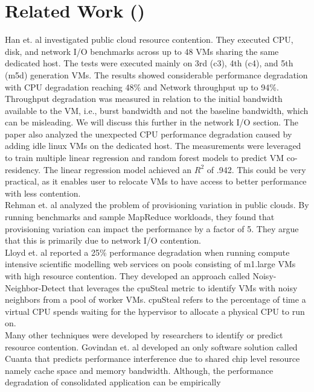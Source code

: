 \chapter{Related Work (\checkmark)}\label{chapter:related}

Han et. al \cite{characterizing_public} investigated public cloud resource contention. They executed
CPU, disk, and network I/O benchmarks across up to 48 VMs sharing the same dedicated host. The tests were
executed mainly on 3rd (c3), 4th (c4), and 5th (m5d) generation VMs.  
The results showed considerable performance degradation with CPU degradation reaching 48\% and 
Network throughput up to 94\%. Throughput degradation was measured in relation to the initial 
bandwidth available to the VM, i.e., burst bandwidth and not the baseline bandwidth, which can be misleading. 
We will discuss this further in the network I/O section. The paper also analyzed the 
unexpected CPU performance degradation caused by adding idle linux VMs on the dedicated host. 
The measurements were leveraged to train multiple linear regression and random forest models to predict
VM co-residency. The linear regression model achieved an $R^2$ of .942.
This could be very practical, as it enables user to relocate VMs to have 
access to better performance with less contention. \\
Rehman et. al \cite{initial_findings} analyzed the problem of provisioning variation in public clouds. 
By running benchmarks and sample MapReduce workloads, they found that provisioning variation can 
impact the performance by a factor of 5. They argue that this is primarily due to network I/O contention. \\
Lloyd et. al \cite{mitigating_resource} reported a 25\% performance degradation when 
running compute intensive scientific modelling web services on pools consisting of m1.large VMs with 
high resource contention. They developed an approach called Noisy-Neighbor-Detect that leverages 
the cpuSteal metric to identify VMs with noisy neighbors from a pool of worker VMs. 
cpuSteal refers to the percentage of time a virtual CPU spends waiting for the hypervisor to allocate 
a physical CPU to run on. \\
Many other techniques were developed by researchers to identify or predict resource contention.
Govindan et. al \cite{cache_contention} developed an only software solution called Cuanta 
that predicts performance interference due to shared chip level resource namely cache space and memory 
bandwidth. Although, the performance degradation of consolidated application can be empirically
